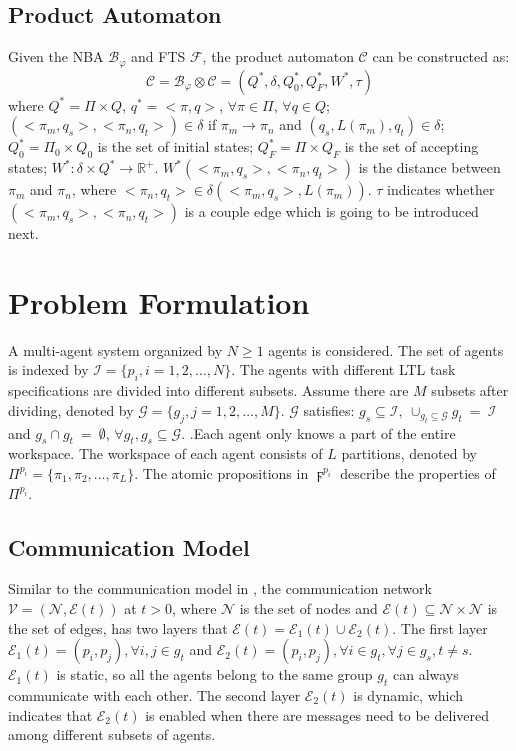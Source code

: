\documentclass[journal]{IEEEtran}
\begin{document}
\subsection{Product Automaton}
Given the NBA $\mathcal{B}_\varphi$ and FTS $\mathcal{F}$, the product automaton $\mathcal{C}$ can be constructed as:
$$\mathcal{C}=\mathcal{B}_\varphi\otimes \mathcal{C}=(Q^{\ast},\delta,Q^{\ast}_0,Q^{\ast}_F,W^{\ast},\tau)$$
where $Q^{\ast}=\Pi\times Q$, $q^{\ast}=<\pi,q>$, $\forall \pi \in \Pi$, $\forall q \in Q$; $(<\pi_m,q_s>,<\pi_n,q_t>)\in \delta$ if $\pi_m \rightarrow \pi_n$ and $(q_s,L(\pi_m),q_t)\in \delta$; $Q^{\ast}_0=\Pi_0\times Q_0$ is the set of initial states; $Q^{\ast}_F=\Pi\times Q_F$ is the set of accepting states; $W^{\ast}:\delta\times Q^{\ast}\rightarrow \mathbb{R}^{+}$. $W^{\ast}(<\pi_m,q_s>,<\pi_n,q_t>)$ is the distance between $\pi_m$ and $\pi_n$, where $<\pi_n,q_t>\in \delta(<\pi_m,q_s>,L(\pi_m))$. $\tau$ indicates whether $(<\pi_m,q_s>,<\pi_n,q_t>)$ is a couple edge which is going to be introduced next.
\section{Problem Formulation}
A multi-agent system organized by $N\geq1$ agents is considered. The set of agents is indexed by $\mathcal{I}=\{p_i,i=1,2,...,N\}$. The agents with different LTL task specifications are divided into different subsets. Assume there are $M$ subsets after dividing, denoted by $\mathcal{G}=\{g_j,j=1,2,...,M\}$. $\mathcal{G}$ satisfies: $g_s\subseteq \mathcal{I},\ \cup_{g_t\subseteq \mathcal{G}}g_t\ =\ \mathcal{I}$ and $g_s\cap g_t\ =\ \emptyset$, $\forall g_t,g_s \subseteq \mathcal{G}$.
.Each agent only knows a part of the entire workspace. The workspace of each agent consists of $L$ partitions, denoted by $\Pi^{p_i}=\{\pi_1,\pi_2,...,\pi_L\}$. The atomic propositions in $\digamma^{p_i}$ describe the properties of $\Pi^{p_i}$.
\subsection{Communication Model}
Similar to the communication model in , the communication network $\mathcal{V}=(\mathcal{N},\mathcal{E}(t))$ at $t>0$, where $\mathcal{N}$ is the set of nodes and $\mathcal{E}(t)\subseteq \mathcal{N} \times \mathcal{N}$ is the set of edges, has two layers that $\mathcal{E}(t)=\mathcal{E}_1(t)\cup \mathcal{E}_2(t)$. The first layer $\mathcal{E}_1(t)={(p_i,p_j),\forall i,j\in g_t}$ and $\mathcal{E}_2(t)={(p_i,p_j),\forall i\in g_t,\forall j \in g_s, t\neq s}$. $\mathcal{E}_1(t)$ is static, so all the agents belong to the same group $g_t$ can always communicate with each other. The second layer $\mathcal{E}_2(t)$ is dynamic, which indicates that $\mathcal{E}_2(t)$ is enabled when there are messages need to be delivered among different subsets of agents.
\end{document}

